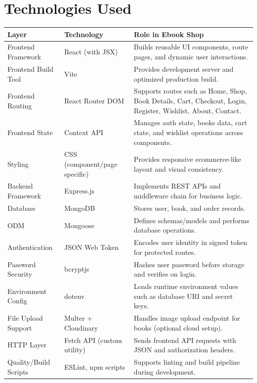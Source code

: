 \documentclass[12pt,a4paper]{report}
\begin{document}
\chapter{Technologies Used}
\begin{longtable}{>{\raggedright\arraybackslash}p{} >{\raggedright\arraybackslash}p{} >{\raggedright\arraybackslash}p{}}
\toprule
\textbf{Layer} & \textbf{Technology} & \textbf{Role in Ebook Shop} \\
\midrule
Frontend Framework & React (with JSX) & Builds reusable UI components, route pages, and dynamic user interactions. \\
Frontend Build Tool & Vite & Provides development server and optimized production build. \\
Frontend Routing & React Router DOM & Supports routes such as Home, Shop, Book Details, Cart, Checkout, Login, Register, Wishlist, About, Contact. \\
Frontend State & Context API & Manages auth state, books data, cart state, and wishlist operations across components. \\
Styling & CSS (component/page specific) & Provides responsive ecommerce-like layout and visual consistency. \\
Backend Framework & Express.js & Implements REST APIs and middleware chain for business logic. \\
Database & MongoDB & Stores user, book, and order records. \\
ODM & Mongoose & Defines schemas/models and performs database operations. \\
Authentication & JSON Web Token & Encodes user identity in signed token for protected routes. \\
Password Security & bcryptjs & Hashes user password before storage and verifies on login. \\
Environment Config & dotenv & Loads runtime environment values such as database URI and secret keys. \\
File Upload Support & Multer + Cloudinary & Handles image upload endpoint for books (optional cloud setup). \\
HTTP Layer & Fetch API (custom utility) & Sends frontend API requests with JSON and authorization headers. \\
Quality/Build Scripts & ESLint, npm scripts & Supports linting and build pipeline during development. \\
\bottomrule
\end{longtable}
\end{document}
